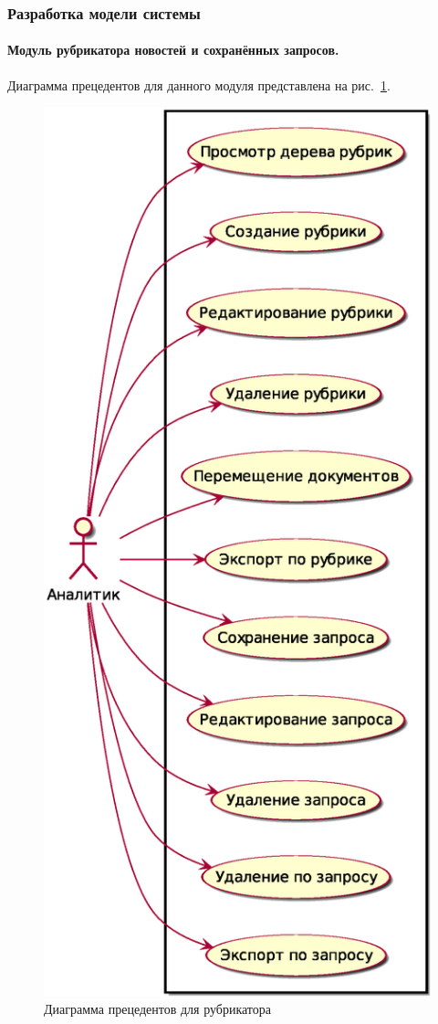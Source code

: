 \subsubsection{Разработка модели системы}

\paragraph{Модуль рубрикатора новостей и сохранённых запросов.} \hfill

Диаграмма прецедентов для данного модуля представлена на рис.~\ref{figure:activityRubricator}.
\begin{figure}[h!]
\centering
\includegraphics[height=0.8\textheight]{design/rubricator_usecase}
\caption{Диаграмма прецедентов для рубрикатора}
\label{figure:activityRubricator}
\end{figure}

